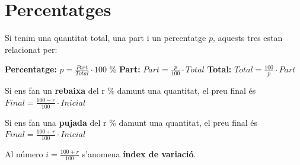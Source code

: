  
\section{Percentatges}

\begin{theorybox}
	Si tenim una quantitat total, una part i un percentatge $p$, aquests tres estan relacionat per:
	
	\textbf{Percentatge:}  $ p = \frac{Part}{Total} \cdot 100$ \%
	\quad
	\textbf{Part:}  $ Part = \frac{p}{100} \cdot Total$
	\quad
	\textbf{Total:} $ Total = \frac{100}{p} \cdot Part$
	
	Si ens fan un \textbf{rebaixa} del r \% damunt una quantitat, el preu final és
	$ Final = \frac{100-r}{100} \cdot Inicial $
	
	Si ens fan una \textbf{pujada} del r \% damunt una quantitat, el preu final és
	$ Final = \frac{100+r}{100} \cdot Inicial$
	 
	Al número $i=\frac{100\pm r}{100}$ s'anomena \textbf{índex de variació}.
\end{theorybox}


